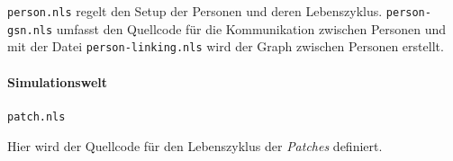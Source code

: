 \verb|person.nls| regelt den Setup der Personen und deren Lebenszyklus. \verb|person-gsn.nls| umfasst den Quellcode für die Kommunikation zwischen Personen und mit der Datei \verb|person-linking.nls| wird der Graph zwischen Personen erstellt.

\paragraph{Simulationswelt}

\begin{verbatim}
patch.nls
\end{verbatim}

Hier wird der Quellcode für den Lebenszyklus der \emph{Patches} definiert.